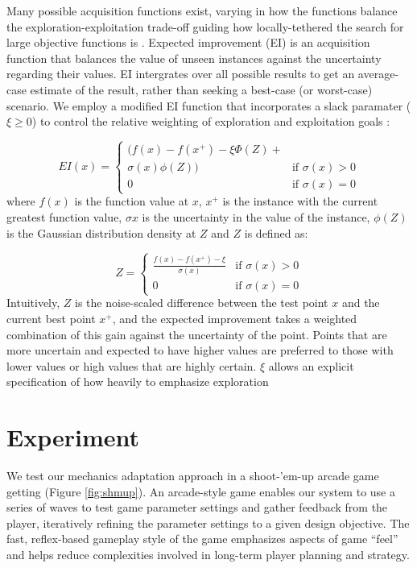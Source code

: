 \documentclass[letterpaper]{article}
\begin{document}
Many possible acquisition functions exist, varying in how the functions balance the exploration-exploitation trade-off guiding how locally-tethered the search for large objective functions is \cite{settles2012:al-book}. Expected improvement (EI) is an acquisition function that balances the value of unseen instances against the uncertainty regarding their values. EI intergrates over all possible results to get an average-case estimate of the result, rather than seeking a best-case (or worst-case) scenario. We employ a modified EI function that incorporates a slack paramater ($\xi \ge 0$) to control the relative weighting of exploration and exploitation goals :


$$ EI(x) = \begin{cases} 
(f(x) - f(x^{+}) - \xi \Phi(Z) + \\ \sigma(x) \phi(Z)) & \mbox{if } \sigma(x) > 0 \\ 
0 & \mbox{if } \sigma(x) = 0 
\end{cases} $$
where $f(x)$ is the function value at $x$, $x^{+}$ is the instance with the current greatest function value, $\sigma{x}$ is the uncertainty in the value of the instance, $\phi(Z)$ is the Gaussian distribution density at $Z$ and $Z$ is defined as:

$$ Z = \begin{cases} 
\frac{f(x) - f(x^{+}) - \xi}{\sigma(x)} & \mbox{if } \sigma(x) > 0 \\ 
0 & \mbox{if } \sigma(x) = 0 
\end{cases} $$
Intuitively, $Z$ is the noise-scaled difference between the test point $x$ and the current best point $x^{+}$, and the expected improvement takes a weighted combination of this gain against the uncertainty of the point. Points that are more uncertain and expected to have higher values are preferred to those with lower values or high values that are highly certain. $\xi$ allows an explicit specification of how heavily to emphasize exploration



\section{Experiment}
We test our mechanics adaptation approach in a shoot-'em-up arcade game getting (Figure \ref{fig:shmup}). An arcade-style game enables our system to use a series of waves to test game parameter settings and gather feedback from the player, iteratively refining the parameter settings to a given design objective. The fast, reflex-based gameplay style of the game emphasizes aspects of game ``feel'' and helps reduce complexities involved in long-term player planning and strategy.
\end{document}
